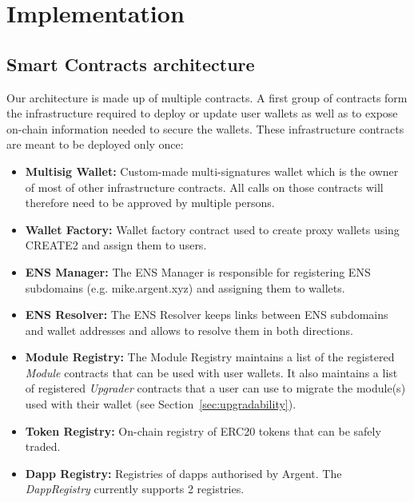 \documentclass[12pt]{article}
\begin{document}
\section{Implementation}

\subsection{Smart Contracts architecture}


Our architecture is made up of multiple contracts. A first group of contracts form the infrastructure required to deploy or update user wallets as well as to expose on-chain information needed to secure the wallets. These infrastructure contracts are meant to be deployed only once:
\begin{itemize}
    \item \textbf{Multisig Wallet:} Custom-made multi-signatures wallet which is the owner of most of other infrastructure contracts. All calls on those contracts will therefore need to be approved by multiple persons.
    \item \textbf{Wallet Factory:} Wallet factory contract used to create proxy wallets using CREATE2 and assign them to users.
    \item \textbf{ENS Manager:} The ENS Manager is responsible for registering ENS subdomains (e.g. mike.argent.xyz) and assigning them to wallets.
    \item \textbf{ENS Resolver:} The ENS Resolver keeps links between ENS subdomains and wallet addresses and allows to resolve them in both directions.
    \item \textbf{Module Registry:} The Module Registry maintains a list of the registered \emph{Module} contracts that can be used with user wallets. It also maintains a list of registered \emph{Upgrader} contracts that a user can use to migrate the module(s) used with their wallet (see Section~\ref{sec:upgradability}).
    \item \textbf{Token Registry:} On-chain registry of ERC20 tokens that can be safely traded.  
    \item \textbf{Dapp Registry:} Registries of dapps authorised by Argent. The \emph{DappRegistry} currently supports 2 registries.
\end{itemize}
\end{document}
